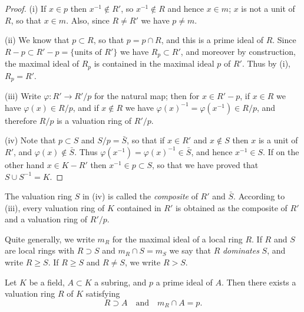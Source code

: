 \begin{proof}
(i) If $x \in p$ then $x^{-1} \notin R'$, so $x^{-1} \notin R$ and hence $x \in m$; $x$ is not a unit of $R$,
so that $x \in m$. Also, since $R \neq R'$ we have $p \neq m$.

(ii) We know that $p \subset R$, so that $p = p \cap R$, and this is a prime ideal of $R$.
Since $R - p \subset R' - p = \{\text{units of } R'\}$ we have $R_p \subset R'$, and moreover by
construction, the maximal ideal of $R_p$ is contained in the maximal ideal $p$ of
$R'$. Thus by (i), $R_p = R'$.

(iii) Write $\varphi\colon R' \to R'/p$ for the natural map; then for $x \in R' - p$, if $x \in R$
we have $\varphi(x) \in R/p$, and if $x \notin R$ we have $\varphi(x)^{-1} = \varphi(x^{-1}) \in R/p$, and
therefore $R/p$ is a valuation ring of $R'/p$.

(iv) Note that $p \subset S$ and $S/p = \bar{S}$, so that if $x \in R'$ and $x \notin S$ then $x$ is
a unit of $R'$, and $\varphi(x) \notin \bar{S}$. Thus $\varphi(x^{-1}) = \varphi(x)^{-1} \in \bar{S}$, and hence $x^{-1} \in S$.
If on the other hand $x \in K - R'$ then $x^{-1} \in p \subset S$, so that we have proved
that $S \cup S^{-1} = K$.
\end{proof}

The valuation ring $S$ in (iv) is called the \emph{composite} of $R'$ and $\bar{S}$. According
to (iii), every valuation ring of $K$ contained in $R'$ is obtained as the
composite of $R'$ and a valuation ring of $R'/p$.

Quite generally, we write $m_R$ for the maximal ideal of a local ring $R$. If $R$
and $S$ are local rings with $R \supset S$ and $m_R \cap S = m_S$ we say that $R$ \emph{dominates} $S$,
and write $R \ge S$. If $R \ge S$ and $R \neq S$, we write $R > S$.

\begin{theorem}\label{thm:10.2}
Let $K$ be a field, $A \subset K$ a subring, and $p$ a prime ideal of $A$.
Then there exists a valuation ring $R$ of $K$ satisfying
\[
  R \supset A \quad \text{and} \quad m_R \cap A = p.
\]
\end{theorem}

